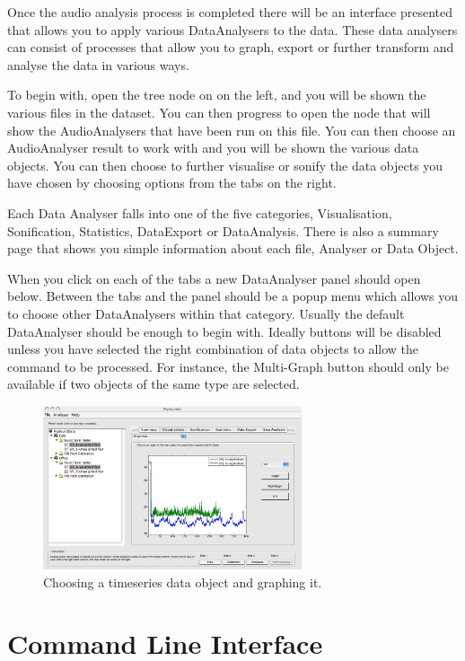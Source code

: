 \documentclass{article}
\begin{document}
Once the audio analysis process is completed there will be an interface presented that allows you to apply various DataAnalysers to the data. These data analysers can consist of processes that allow you to graph, export or further transform and analyse the data in various ways. 

To begin with, open the tree node on on the left, and you will be shown the various files in the dataset. You can then progress to open the node that will show the AudioAnalysers that have been run on this file. You can then choose an AudioAnalyser result to work with and you will be shown the various data objects. You can then choose to further visualise or sonify the data objects you have chosen by choosing options from the tabs on the right. 

Each Data Analyser falls into one of the five categories, Visualisation, Sonification, Statistics, DataExport or DataAnalysis. There is also a summary page that shows you simple information about each file, Analyser or Data Object. 

When you click on each of the tabs a new DataAnalyser panel should open below. Between the tabs and the panel should be a popup menu which allows you to choose other DataAnalysers within that category. Usually the default DataAnalyser should be enough to begin with. Ideally buttons will be disabled unless you have selected the right combination of data objects to allow the command to be processed. For instance, the Multi-Graph button should only be available if two objects of the same type are selected.

\begin{figure}[htbp]
	\centering
		\includegraphics[width=3in]{Step4-NodeOpen.jpg}
	\caption{Choosing a timeseries data object and graphing it.}
	\label{fig:stage12}
\end{figure}

\clearpage
\section{Command Line Interface}
\end{document}
